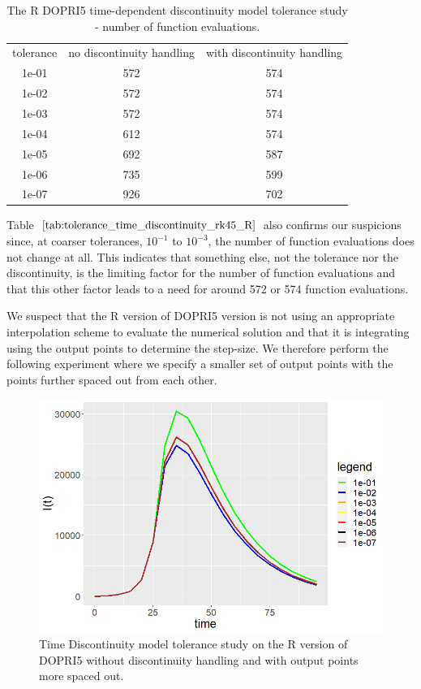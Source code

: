 \begin{table}[H]
\caption {The R DOPRI5 time-dependent discontinuity model tolerance study - number of function evaluations.} \label{tab:tolerance_time_discontinuity_rk45_R} 
\begin{center}
\begin{tabular}{ c c c }
tolerance & no discontinuity handling & with discontinuity handling\\ 
1e-01 & 572 & 574 \\
1e-02 & 572 & 574 \\
1e-03 & 572 & 574 \\
1e-04 & 612 & 574 \\
1e-05 & 692 & 587 \\
1e-06 & 735 & 599 \\
1e-07 & 926 & 702 \\
\end{tabular}
\end{center}
\end{table}

Table $\ref{tab:tolerance_time_discontinuity_rk45_R}$ also confirms our suspicions since, at coarser tolerances, $10^{-1}$ to $10^{-3}$, the number of function evaluations does not change at all. This indicates that something else, not the tolerance nor the discontinuity, is the limiting factor for the number of function evaluations and that this other factor leads to a need for around 572 or 574 function evaluations.

We suspect that the R version of DOPRI5 version is not using an appropriate interpolation scheme to evaluate the numerical solution and that it is integrating using the output points to determine the step-size. We therefore perform the following experiment where we specify a smaller set of output points with the points further spaced out from each other.

\begin{figure}[H]
\centering
\includegraphics[width=0.7\linewidth]{./figures/tolerance_time_rk45_further_no_event_R}
\caption{Time Discontinuity model tolerance study on the R version of DOPRI5 without discontinuity handling and with output points more spaced out.}
\label{fig:tolerance_time_rk45_further_no_event_R}
\end{figure}


